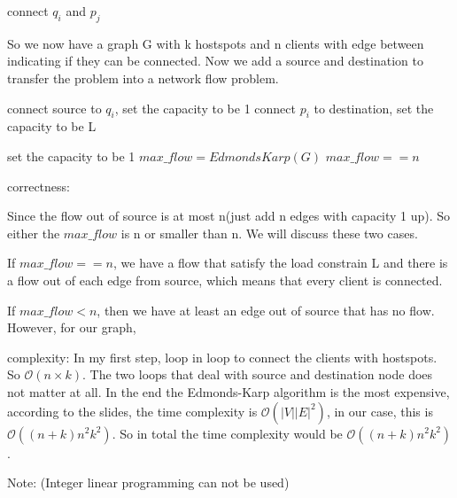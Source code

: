 \documentclass{article}
\newcommand{\bigO}{\mathcal{O}}
\begin{document}
\begin{itemize}
\begin{algorithm}[H]
\begin{algorithmic}[1]
                    \State connect $q_i$ and $p_j$
                \EndIf
            \EndFor
        \EndFor

        \State So we now have a graph G with k hostspots and n clients with edge between indicating if they can be connected. 
        \State Now we add a source and destination to transfer the problem into a network flow problem. 

            \State connect source to $q_i$, set the capacity to be 1
        \EndFor
            \State connect $p_i$ to destination, set the capacity to be L
        \EndFor

            \State set the capacity to be 1
        \EndFor
        \State $max\_flow = EdmondsKarp(G)$
        \State \Return $max\_flow == n $
    \end{algorithmic}  
\end{algorithm}

correctness:

Since the flow out of source is at most n(just add n edges with capacity 1 up). So either the $max\_flow$ is n or smaller than n. We will discuss these two cases.

If $max\_flow == n$, we have a flow that satisfy the load constrain L and there is a flow out of each edge from source, which means that every client is connected.

If $max\_flow < n$, then we have at least an edge out of source that has no flow. However, for our graph, 

complexity:
In my first step, loop in loop to connect the clients with hostspots. So $\bigO(n\times k)$. The two loops that deal with source and destination node does not matter at all. In the end the Edmonds-Karp algorithm is the most expensive, according to the slides, the time complexity is $\bigO (|V||E|^2)$, in our case, this is $\bigO((n+k)n^2k^2)$. So in total the time complexity would be $\bigO((n+k)n^2k^2)$. 

Note: (Integer linear programming can not be used)


\end{itemize}

\end{document}
